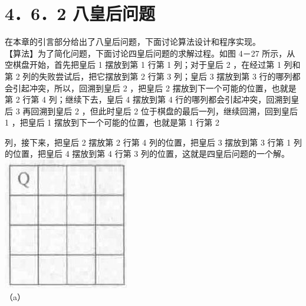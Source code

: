 \documentclass[10pt]{article}
\begin{document}
\section*{4．6．2 八皇后问题}
在本章的引言部分给出了八皇后问题，下面讨论算法设计和程序实现。\\
【算法】为了简化问题，下面讨论四皇后问题的求解过程。如图 4－27 所示，从空棋盘开始，首先把皇后 1 摆放到第 1 行第 1 列；对于皇后 2 ，在经过第 1 列和第 2 列的失败尝试后，把它摆放到第 2 行第 3 列；皇后 3 摆放到第 3 行的哪列都会引起冲突，所以，回溯到皇后 2 ，把皇后 2 摆放到下一个可能的位置，也就是第 2 行第 4 列；继续下去，皇后 4 摆放到第 4 行的哪列都会引起冲突，回溯到皇后 3 再回溯到皇后 2 ，但此时皇后 2 位于棋盘的最后一列，继续回溯，回到皇后 1 ，把皇后 1 摆放到下一个可能的位置，也就是第 1 行第 2

列，接下来，把皇后 2 摆放第 2 行第 4 列的位置，把皇后 3 摆放到第 3 行第 1 列的位置，把皇后 4 摆放到第 4 行第 3 列的位置，这就是四皇后问题的一个解。\\
\includegraphics[max width=\textwidth, center]{2025_06_06_704745ea57b15b2333e5g-135(4)}\\
（a）\\
\end{document}
